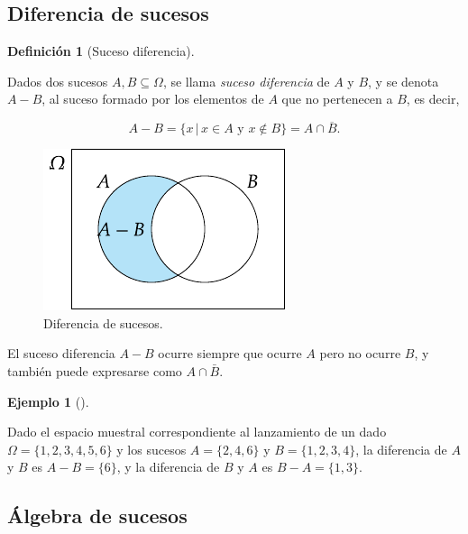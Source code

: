 \documentclass[
  a4paper,
]{scrreport}
\theoremstyle{plain}
\theoremstyle{definition}
\newtheorem{definition}{Definición}[chapter]
\theoremstyle{definition}
\newtheorem{example}{Ejemplo}[chapter]
\theoremstyle{remark}
\begin{document}
\subsection{Diferencia de sucesos}\label{diferencia-de-sucesos}

\begin{definition}[Suceso
diferencia]\protect\hypertarget{def-diferencia-sucesos}{}\label{def-diferencia-sucesos}

Dados dos sucesos \(A,B\subseteq \Omega\), se llama \emph{suceso
diferencia} de \(A\) y \(B\), y se denota \(A-B\), al suceso formado por
los elementos de \(A\) que no pertenecen a \(B\), es decir,

\[A-B = \{x\,|\, x\in A\mbox{ y }x\not\in B\} = A \cap \overline B.\]

\end{definition}

\begin{figure}[H]

{\centering \includegraphics{img/probabilidad/diferencia.pdf}

}

\caption{Diferencia de sucesos.}

\end{figure}%

El suceso diferencia \(A-B\) ocurre siempre que ocurre \(A\) pero no
ocurre \(B\), y también puede expresarse como \(A\cap \bar B\).

\begin{example}[]\protect\hypertarget{exm-diferencia-sucesos}{}\label{exm-diferencia-sucesos}

Dado el espacio muestral correspondiente al lanzamiento de un dado
\(\Omega=\{1,2,3,4,5,6\}\) y los sucesos \(A=\{2,4,6\}\) y
\(B=\{1,2,3,4\}\), la diferencia de \(A\) y \(B\) es \(A-B=\{6\}\), y la
diferencia de \(B\) y \(A\) es \(B-A=\{1,3\}\).

\end{example}

\subsection{Álgebra de sucesos}\label{uxe1lgebra-de-sucesos}
\end{document}
